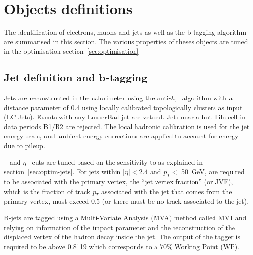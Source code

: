 \newpage
\section{Objects definitions}
\label{sec:objects}

The identification of electrons, muons and jets as well as the b-tagging
algorithm are summarised in this section. The various properties of theses
objects are tuned in the optimisation section~\ref{sec:optimisation}


\subsection{Jet definition and b-tagging}
\label{sec:jets}
Jets are reconstructed in the calorimeter using the anti-$k_t$~\cite{Cacciari:2008gp} algorithm
with a distance parameter of 0.4 using locally calibrated
topologically clusters as input (LC Jets). Events with any LooserBad jet are vetoed. Jets near a hot Tile cell in data periods
B1/B2 are rejected. The local hadronic calibration is used for
the jet energy scale, and ambient energy corrections are applied to account
for energy due to pileup.


\pt~ and $\eta$~ cuts are tuned based on the sensitivity to \tth
as explained in section~\ref{sec:optim-jets}. 
 For jets within $|\eta| < 2.4$ and $p_T <$ 50~GeV, are required to be
associated with the primary vertex, the ``jet vertex fraction'' (or JVF),
which is the fraction
of track $p_T$ associated with the jet that comes from the primary vertex,
must exceed 0.5 (or there must be no track associated to the jet). 

B-jets are tagged using a Multi-Variate Analysis (MVA) method called MV1 and relying on information
of the impact parameter and the reconstruction of the displaced vertex of the
hadron decay inside the jet.%
 The output of the tagger is 
required to be above 0.8119 which corresponds to a $70\%$ Working Point (WP).

